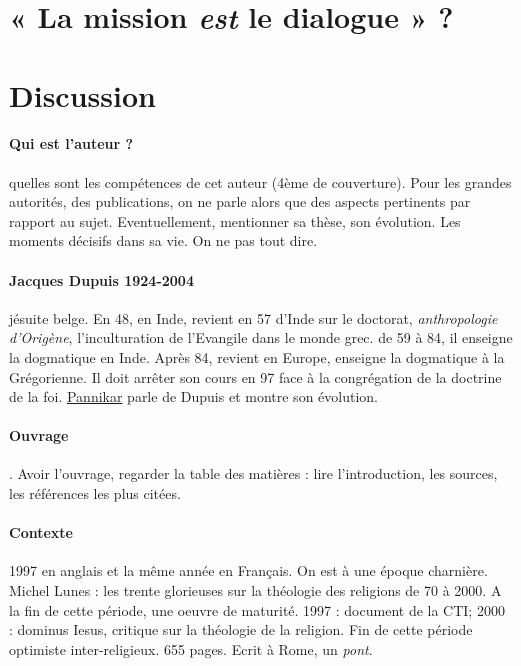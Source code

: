 \section{« La mission \textit{est} le dialogue » ?}

\section{Discussion}

\paragraph{Qui est l'auteur ?} quelles sont les compétences de cet auteur (4ème de couverture). Pour les grandes autorités, des publications, on ne parle alors que des aspects pertinents par rapport au sujet. Eventuellement, mentionner sa thèse, son évolution. Les moments décisifs dans sa vie. On ne pas tout dire. 
\paragraph{Jacques Dupuis 1924-2004} jésuite belge. En 48, en Inde, revient en 57 d'Inde sur le doctorat, \textit{anthropologie d'Origène}, l'inculturation de l'Evangile dans le monde grec. de 59 à 84, il enseigne la dogmatique en Inde. Après 84, revient en Europe, enseigne la dogmatique à la Grégorienne. Il doit arrêter son cours en 97 face à la congrégation de la doctrine de la foi. \href{https://fr.wikipedia.org/wiki/Raimon_Panikkar}{Pannikar} parle de Dupuis et montre son évolution. 

\paragraph{Ouvrage}. Avoir l'ouvrage, regarder la table des matières : lire l'introduction, les sources, les références les plus citées. 

\paragraph{Contexte} 1997 en anglais et la même année en Français. On est à une époque charnière. Michel Lunes : les trente glorieuses sur la théologie des religions de 70 à 2000. A la fin de cette période, une oeuvre de maturité. 1997 : document de la CTI; 2000 : dominus Iesus, critique sur la théologie de la religion.  Fin de cette période optimiste inter-religieux. 655 pages. Ecrit à Rome, un \textit{pont}.

